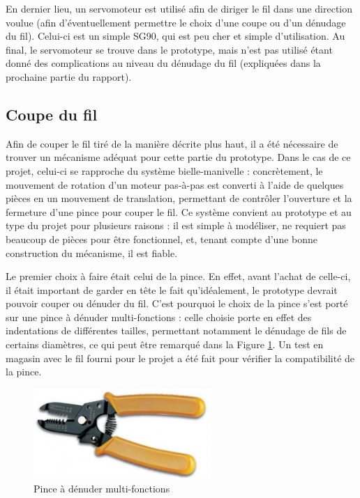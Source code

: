 \par En dernier lieu, un servomoteur est utilisé afin de diriger le fil dans une direction voulue (afin d'éventuellement permettre le choix d'une coupe ou d'un dénudage du fil). Celui-ci est un simple SG90, qui est peu cher et simple d'utilisation. Au final, le servomoteur se trouve dans le prototype, mais n'est pas utilisé étant donné des complications au niveau du dénudage du fil (expliquées dans la prochaine partie du rapport).

\subsection{Coupe du fil}

\par Afin de couper le fil tiré de la manière décrite plus haut, il a été nécessaire de trouver un mécanisme adéquat pour cette partie du prototype. Dans le cas de ce projet, celui-ci se rapproche du système bielle-manivelle : concrètement, le mouvement de rotation d'un moteur pas-à-pas est converti à l'aide de quelques pièces en un mouvement de translation, permettant de contrôler l'ouverture et la fermeture d'une pince pour couper le fil. Ce système convient au prototype et au type du projet pour plusieurs raisons : il est simple à modéliser, ne requiert pas beaucoup de pièces pour être fonctionnel, et, tenant compte d'une bonne construction du mécanisme, il est fiable.

\par Le premier choix à faire était celui de la pince. En effet, avant l'achat de celle-ci, il était important de garder en tête le fait qu'idéalement, le prototype devrait pouvoir couper ou dénuder du fil. C'est pourquoi le choix de la pince s'est porté sur une pince à dénuder multi-fonctions : celle choisie porte en effet des indentations de différentes tailles, permettant notamment le dénudage de fils de certains diamètres, ce qui peut être remarqué dans la Figure \ref{fig:pince}. Un test en magasin avec le fil fourni pour le projet a été fait pour vérifier la compatibilité de la pince. 

\begin{figure}[H]
    \centering
    \includegraphics[width=0.6\textwidth]{images/pince.jpg}
    \caption{Pince à dénuder multi-fonctions}
    \label{fig:pince}
\end{figure}

